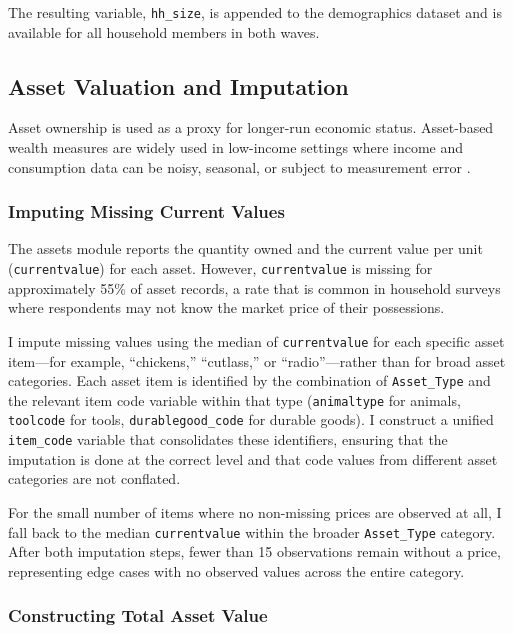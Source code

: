 \documentclass[12pt]{article}
\begin{document}
The resulting variable, \texttt{hh\_size}, is appended to the demographics dataset and is available for all household members in both waves.


\subsection{Asset Valuation and Imputation}

Asset ownership is used as a proxy for longer-run economic status. Asset-based wealth measures are widely used in low-income settings where income and consumption data can be noisy, seasonal, or subject to measurement error \citep{FilmerPritchett2001, SahnStifel2003}.

\subsubsection{Imputing Missing Current Values}

The assets module reports the quantity owned and the current value per unit (\texttt{currentvalue}) for each asset. However, \texttt{currentvalue} is missing for approximately 55\% of asset records, a rate that is common in household surveys where respondents may not know the market price of their possessions.

I impute missing values using the median of \texttt{currentvalue} for each specific asset item---for example, ``chickens,'' ``cutlass,'' or ``radio''---rather than for broad asset categories. Each asset item is identified by the combination of \texttt{Asset\_Type} and the relevant item code variable within that type (\texttt{animaltype} for animals, \texttt{toolcode} for tools, \texttt{durablegood\_code} for durable goods). I construct a unified \texttt{item\_code} variable that consolidates these identifiers, ensuring that the imputation is done at the correct level and that code values from different asset categories are not conflated.

For the small number of items where no non-missing prices are observed at all, I fall back to the median \texttt{currentvalue} within the broader \texttt{Asset\_Type} category. After both imputation steps, fewer than 15 observations remain without a price, representing edge cases with no observed values across the entire category.


\subsubsection{Constructing Total Asset Value}
\end{document}
